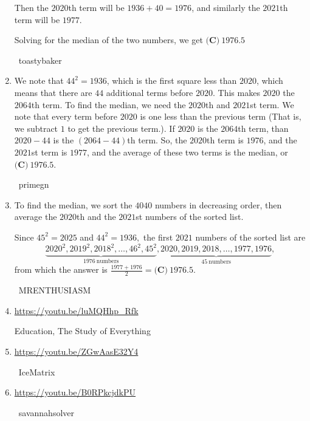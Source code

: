 \documentclass{article}%
\begin{document}
\begin{enumerate}
Then the $2020$th term will be $1936+40 = 1976$, and similarly the $2021$th term will be $1977$.

Solving for the median of the two numbers, we get $\boxed{\textbf{(C)}\ 1976.5}$

~toastybaker

%
\item%
We note that $44^2 = 1936$, which is the first square less than $2020$, which means that there are $44$ additional terms before $2020$. This makes $2020$ the $2064$th term. To find the median, we need the $2020$th and $2021$st term. We note that every term before $2020$ is one less than the previous term (That is, we subtract $1$ to get the previous term.). If $2020$ is the $2064$th term, than $2020 - 44$ is the $(2064 - 44)$th term. So, the $2020$th term is $1976$, and the $2021$st term is $1977$, and the average of these two terms is the median, or $\boxed{\textbf{(C)}\ 1976.5}$.

~primegn

%
\item%
To find the median, we sort the $4040$ numbers in decreasing order, then average the $2020$th and the $2021$st numbers of the sorted list.

Since $45^2=2025$ and $44^2=1936,$ the first $2021$ numbers of the sorted list are \[\underbrace{2020^2,2019^2,2018^2,\ldots,46^2,45^2}_{1976\mathrm{ \ numbers}}\phantom{ },\phantom{ }\underbrace{2020,2019,2018,\ldots,1977,1976}_{45\mathrm{ \ numbers}}\phantom{ },\] from which the answer is $\frac{1977+1976}{2}=\boxed{\textbf{(C)}\ 1976.5}.$

~MRENTHUSIASM

%
\item%
\href{https://youtu.be/luMQHhp_Rfk}{https://youtu.be/luMQHhp\_Rfk}

Education, The Study of Everything

%
\item%
\href{https://youtu.be/ZGwAasE32Y4}{https://youtu.be/ZGwAasE32Y4}

~IceMatrix

%
\item%
\href{https://youtu.be/B0RPkcjdkPU}{https://youtu.be/B0RPkcjdkPU}

~savannahsolver

%
\end{enumerate}

%
\end{document}
